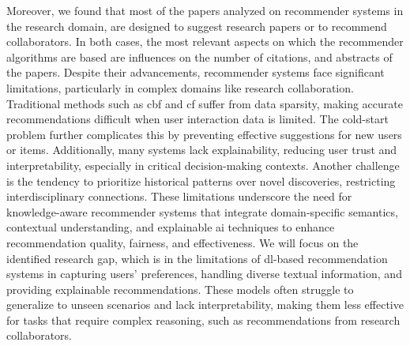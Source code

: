 Moreover, we found that most of the papers analyzed on recommender systems in the research domain, are designed to suggest research papers or to recommend collaborators.
In both cases, the most relevant aspects on which the recommender algorithms are based are influences on the number of citations, and abstracts of the papers.
Despite their advancements, recommender systems face significant limitations, particularly in complex domains like research collaboration.
Traditional methods such as \gls{cbf} and \gls{cf} suffer from data sparsity, making accurate recommendations difficult when user interaction data is limited.
The cold-start problem further complicates this by preventing effective suggestions for new users or items.
Additionally, many systems lack explainability, reducing user trust and interpretability, especially in critical decision-making contexts.
Another challenge is the tendency to prioritize historical patterns over novel discoveries, restricting interdisciplinary connections.
These limitations underscore the need for knowledge-aware recommender systems that integrate domain-specific semantics, contextual understanding, and explainable \gls{ai} techniques to enhance recommendation quality, fairness, and effectiveness.
We will focus on the identified research gap, which is in the limitations of \gls{dl}-based recommendation systems in capturing users' preferences, handling diverse textual information, and providing explainable recommendations.
These models often struggle to generalize to unseen scenarios and lack interpretability, making them less effective for tasks that require complex reasoning, such as recommendations from research collaborators.

